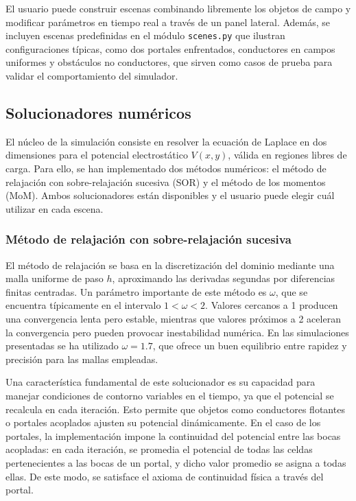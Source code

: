 \documentclass[12pt, twocolumn]{article}
\begin{document}
El usuario puede construir escenas combinando libremente los objetos de campo y modificar parámetros en tiempo real a través de un panel lateral. Además, se incluyen escenas predefinidas en el módulo \texttt{scenes.py} que ilustran configuraciones típicas, como dos portales enfrentados, conductores en campos uniformes y obstáculos no conductores, que sirven como casos de prueba para validar el comportamiento del simulador.

\subsection{Solucionadores numéricos}

El núcleo de la simulación consiste en resolver la ecuación de Laplace en dos dimensiones para el potencial electrostático $V(x,y)$, válida en regiones libres de carga. Para ello, se han implementado dos métodos numéricos: el método de relajación con sobre-relajación sucesiva (SOR) y el método de los momentos (MoM). Ambos solucionadores están disponibles y el usuario puede elegir cuál utilizar en cada escena.

\subsubsection{Método de relajación con sobre-relajación sucesiva}

El método de relajación se basa en la discretización del dominio mediante una malla uniforme de paso $h$, aproximando las derivadas segundas por diferencias finitas centradas. Un parámetro importante de este método es $\omega$, que se encuentra típicamente en el intervalo $1 < \omega < 2$. Valores cercanos a 1 producen una convergencia lenta pero estable, mientras que valores próximos a 2 aceleran la convergencia pero pueden provocar inestabilidad numérica. En las simulaciones presentadas se ha utilizado $\omega = 1.7$, que ofrece un buen equilibrio entre rapidez y precisión para las mallas empleadas.

Una característica fundamental de este solucionador es su capacidad para manejar condiciones de contorno variables en el tiempo, ya que el potencial se recalcula en cada iteración. Esto permite que objetos como conductores flotantes o portales acoplados ajusten su potencial dinámicamente. En el caso de los portales, la implementación impone la continuidad del potencial entre las bocas acopladas: en cada iteración, se promedia el potencial de todas las celdas pertenecientes a las bocas de un portal, y dicho valor promedio se asigna a todas ellas. De este modo, se satisface el axioma de continuidad física a través del portal.
\end{document}

